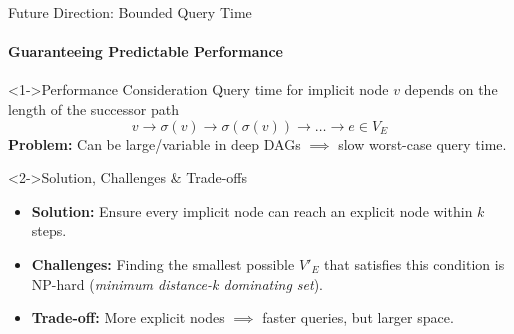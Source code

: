 \begin{frame}{Future Direction: Bounded Query Time}
    \framesubtitle{Guaranteeing Predictable Performance}
    \begin{block}<1->{Performance Consideration}
        Query time for implicit node $v$ depends on the length of the successor path
        \vspace{-0.3em}
        \[v \to \sigma(v) \to \sigma(\sigma(v)) \to \dots \to e \in V_E\]
        \textbf{Problem:} Can be large/variable in deep DAGs $\implies$ slow worst-case query time.
    \end{block}
    \begin{alertblock}<2->{Solution, Challenges \& Trade-offs}
        \begin{itemize}
            \item \textbf{Solution:} Ensure every implicit node can reach an explicit node within \alert{$k$ steps}.
            \item \textbf{Challenges:} Finding the smallest possible $V'_E$ that satisfies this condition is NP-hard (\emph{minimum distance-k dominating set}).
            \item \textbf{Trade-off:} More explicit nodes $\implies$ faster queries, but larger space.
        \end{itemize}
    \end{alertblock}
\end{frame}
